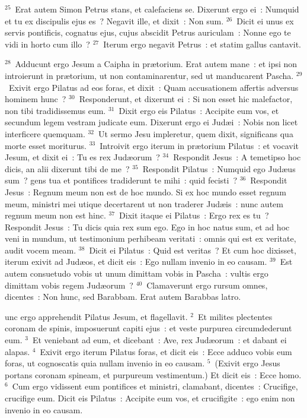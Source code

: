 ${}^{25}$~Erat autem Simon Petrus stans, et calefaciens se. Dixerunt ergo ei~: Numquid et tu ex discipulis ejus es~? Negavit ille, et dixit~: Non sum.
${}^{26}$~Dicit ei unus ex servis pontificis, cognatus ejus, cujus abscidit Petrus auriculam~: Nonne ego te vidi in horto cum illo~?
${}^{27}$~Iterum ergo negavit Petrus~: et statim gallus cantavit.


${}^{28}$~Adducunt ergo Jesum a Caipha in pr\ae torium. Erat autem mane~: et ipsi non introierunt in pr\ae torium, ut non contaminarentur, sed ut manducarent Pascha.
${}^{29}$~Exivit ergo Pilatus ad eos foras, et dixit~: Quam accusationem affertis adversus hominem hunc~?
${}^{30}$~Responderunt, et dixerunt ei~: Si non esset hic malefactor, non tibi tradidissemus eum.
${}^{31}$~Dixit ergo eis Pilatus~: Accipite eum vos, et secundum legem vestram judicate eum. Dixerunt ergo ei Jud\ae i~: Nobis non licet interficere quemquam.
${}^{32}$~Ut sermo Jesu impleretur, quem dixit, significans qua morte esset moriturus.
${}^{33}$~Introivit ergo iterum in pr\ae torium Pilatus~: et vocavit Jesum, et dixit ei~: Tu es rex Jud\ae orum~?
${}^{34}$~Respondit Jesus~: A temetipso hoc dicis, an alii dixerunt tibi de me~?
${}^{35}$~Respondit Pilatus~: Numquid ego Jud\ae us sum~? gens tua et pontifices tradiderunt te mihi~: quid fecisti~?
${}^{36}$~Respondit Jesus~: Regnum meum non est de hoc mundo. Si ex hoc mundo esset regnum meum, ministri mei utique decertarent ut non traderer Jud\ae is~: nunc autem regnum meum non est hinc.
${}^{37}$~Dixit itaque ei Pilatus~: Ergo rex es tu~? Respondit Jesus~: Tu dicis quia rex sum ego. Ego in hoc natus sum, et ad hoc veni in mundum, ut testimonium perhibeam veritati~: omnis qui est ex veritate, audit vocem meam.
${}^{38}$~Dicit ei Pilatus~: Quid est veritas~? Et cum hoc dixisset, iterum exivit ad Jud\ae os, et dicit eis~: Ego nullam invenio in eo causam.
${}^{39}$~Est autem consuetudo vobis ut unum dimittam vobis in Pascha~: vultis ergo dimittam vobis regem Jud\ae orum~?
${}^{40}$~Clamaverunt ergo rursum omnes, dicentes~: Non hunc, sed Barabbam. Erat autem Barabbas latro.

\bchapter
{}unc ergo apprehendit Pilatus Jesum, et flagellavit.
${}^{2}$~Et milites plectentes coronam de spinis, imposuerunt capiti ejus~: et veste purpurea circumdederunt eum.
${}^{3}$~Et veniebant ad eum, et dicebant~: Ave, rex Jud\ae orum~: et dabant ei alapas.
${}^{4}$~Exivit ergo iterum Pilatus foras, et dicit eis~: Ecce adduco vobis eum foras, ut cognoscatis quia nullam invenio in eo causam.
${}^{5}$~(Exivit ergo Jesus portans coronam spineam, et purpureum vestimentum.) Et dicit eis~: Ecce homo.
${}^{6}$~Cum ergo vidissent eum pontifices et ministri, clamabant, dicentes~: Crucifige, crucifige eum. Dicit eis Pilatus~: Accipite eum vos, et crucifigite~: ego enim non invenio in eo causam.


